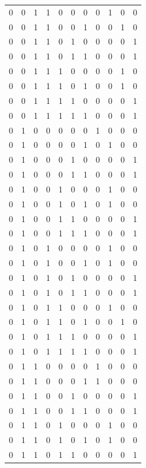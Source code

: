 \begin{longtable}{|c|c|c|c|c|c|c|c|c|c|c|}
0 & 0 & 1 & 1 & 0 & 0 & 0 &  0 & 1 & 0 & 0 \\
0 & 0 & 1 & 1 & 0 & 0 & 1 &  0 & 0 & 1 & 0 \\
0 & 0 & 1 & 1 & 0 & 1 & 0 &  0 & 0 & 0 & 1 \\
0 & 0 & 1 & 1 & 0 & 1 & 1 &  0 & 0 & 0 & 1 \\
0 & 0 & 1 & 1 & 1 & 0 & 0 &  0 & 0 & 1 & 0 \\
0 & 0 & 1 & 1 & 1 & 0 & 1 &  0 & 0 & 1 & 0 \\
0 & 0 & 1 & 1 & 1 & 1 & 0 &  0 & 0 & 0 & 1 \\
0 & 0 & 1 & 1 & 1 & 1 & 1 &  0 & 0 & 0 & 1 \\
0 & 1 & 0 & 0 & 0 & 0 & 0 &  1 & 0 & 0 & 0 \\
0 & 1 & 0 & 0 & 0 & 0 & 1 &  0 & 1 & 0 & 0 \\
0 & 1 & 0 & 0 & 0 & 1 & 0 &  0 & 0 & 0 & 1 \\
0 & 1 & 0 & 0 & 0 & 1 & 1 &  0 & 0 & 0 & 1 \\
0 & 1 & 0 & 0 & 1 & 0 & 0 &  0 & 1 & 0 & 0 \\
0 & 1 & 0 & 0 & 1 & 0 & 1 &  0 & 1 & 0 & 0 \\
0 & 1 & 0 & 0 & 1 & 1 & 0 &  0 & 0 & 0 & 1 \\
0 & 1 & 0 & 0 & 1 & 1 & 1 &  0 & 0 & 0 & 1 \\
0 & 1 & 0 & 1 & 0 & 0 & 0 &  0 & 1 & 0 & 0 \\
0 & 1 & 0 & 1 & 0 & 0 & 1 &  0 & 1 & 0 & 0 \\
0 & 1 & 0 & 1 & 0 & 1 & 0 &  0 & 0 & 0 & 1 \\
0 & 1 & 0 & 1 & 0 & 1 & 1 &  0 & 0 & 0 & 1 \\
0 & 1 & 0 & 1 & 1 & 0 & 0 &  0 & 1 & 0 & 0 \\
0 & 1 & 0 & 1 & 1 & 0 & 1 &  0 & 0 & 1 & 0 \\
0 & 1 & 0 & 1 & 1 & 1 & 0 &  0 & 0 & 0 & 1 \\
0 & 1 & 0 & 1 & 1 & 1 & 1 &  0 & 0 & 0 & 1 \\
0 & 1 & 1 & 0 & 0 & 0 & 0 &  1 & 0 & 0 & 0 \\
0 & 1 & 1 & 0 & 0 & 0 & 1 &  1 & 0 & 0 & 0 \\
0 & 1 & 1 & 0 & 0 & 1 & 0 &  0 & 0 & 0 & 1 \\
0 & 1 & 1 & 0 & 0 & 1 & 1 &  0 & 0 & 0 & 1 \\
0 & 1 & 1 & 0 & 1 & 0 & 0 &  0 & 1 & 0 & 0 \\
0 & 1 & 1 & 0 & 1 & 0 & 1 &  0 & 1 & 0 & 0 \\
0 & 1 & 1 & 0 & 1 & 1 & 0 &  0 & 0 & 0 & 1 \\

\end{longtable}
